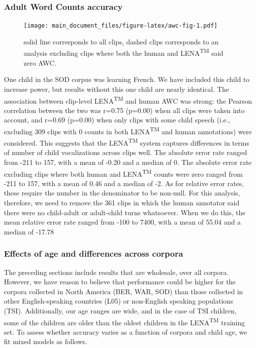 \documentclass[english,floatsintext,man]{apa6}
\begin{document}
\subsubsection{Adult Word Counts
accuracy}\label{adult-word-counts-accuracy}

\begin{figure}
\centering
\texttt{[image: main\_document\_files/figure-latex/awc-fig-1.pdf]}
\caption{\label{fig:awc-fig}solid line corresponds to all clips, dashed
clips corresponds to an analysis excluding clips where both the human
and LENA\textsuperscript{TM} said zero AWC.}
\end{figure}

One child in the SOD corpus was learning French. We have included this
child to increase power, but results without this one child are nearly
identical. The association between clip-level LENA\textsuperscript{TM}
and human AWC was strong: the Pearson correlation between the two was
r=0.75 (p=0.00) when all clips were taken into account, and r=0.69
(p=0.00) when only clips with some child speech (i.e., excluding 309
clips with 0 counts in both LENA\textsuperscript{TM} and human
annotations) were considered. This suggests that the
LENA\textsuperscript{TM} system captures differences in terms of number
of child vocalizations across clips well. The absolute error rate ranged
from -211 to 157, with a mean of -0.20 and a median of 0. The absolute
error rate excluding clips where both human and LENA\textsuperscript{TM}
counts were zero ranged from -211 to 157, with a mean of 0.46 and a
median of -2. As for relative error rates, these require the number in
the denominator to be non-null. For this analysis, therefore, we need to
remove the 361 clips in which the human annotator said there were no
child-adult or adult-child turns whatsoever. When we do this, the mean
relative error rate ranged from -100 to 7400, with a mean of 55.04 and a
median of -17.78

\subsubsection{Effects of age and differences across
corpora}\label{effects-of-age-and-differences-across-corpora}

The preceding sections include results that are wholesale, over all
corpora. However, we have reason to believe that performance could be
higher for the corpora collected in North America (BER, WAR, SOD) than
those collected in other English-speaking countries (L05) or non-English
speaking populations (TSI). Additionally, our age ranges are wide, and
in the case of TSI children, some of the children are older than the
oldest children in the LENA\textsuperscript{TM} training set. To assess
whether accuracy varies as a function of corpora and child age, we fit
mixed models as follows.
\end{document}

